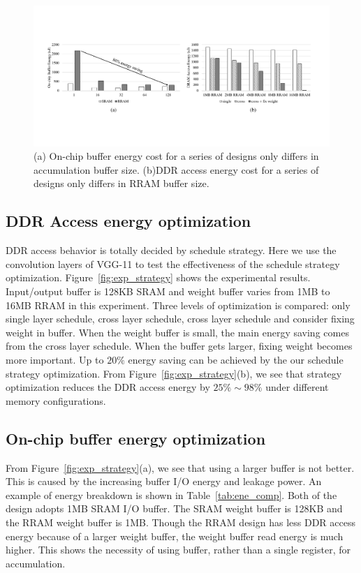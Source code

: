 \begin{figure}[t]
  \centering
  \includegraphics[width=2\columnwidth]{fig/breakdown.pdf}
  \caption{(a) On-chip buffer energy cost for a series of designs only differs in accumulation buffer size. (b)DDR access energy cost for a series of designs only differs in RRAM buffer size.}
  \label{fig:breakdown}
\end{figure}

\subsection{DDR Access energy optimization}

DDR access behavior is totally decided by schedule strategy. Here we use the convolution layers of VGG-11 to test the effectiveness of the schedule strategy optimization. Figure~\ref{fig:exp_strategy} shows the experimental results. Input/output buffer is 128KB SRAM and weight buffer varies from 1MB to 16MB RRAM in this experiment. Three levels of optimization is compared: only single layer schedule, cross layer schedule, cross layer schedule and consider fixing weight in buffer. When the weight buffer is small, the main energy saving comes from the cross layer schedule. When the buffer gets larger, fixing weight becomes more important. Up to $20\%$ energy saving can be achieved by the our schedule strategy optimization. From Figure~\ref{fig:exp_strategy}(b), we see that strategy optimization reduces the DDR access energy by $25\%\sim 98\%$ under different memory configurations.

\subsection{On-chip buffer energy optimization}
From Figure~\ref{fig:exp_strategy}(a), we see that using a larger buffer is not better. This is caused by the increasing buffer I/O energy and leakage power. An example of energy breakdown is shown in Table~\ref{tab:ene_comp}. Both of the design adopts 1MB SRAM I/O buffer. The SRAM weight buffer is 128KB and the RRAM weight buffer is 1MB. Though the RRAM design has less DDR access energy because of a larger weight buffer, the weight buffer read energy is much higher. This shows the necessity of using buffer, rather than a single register, for accumulation. 


